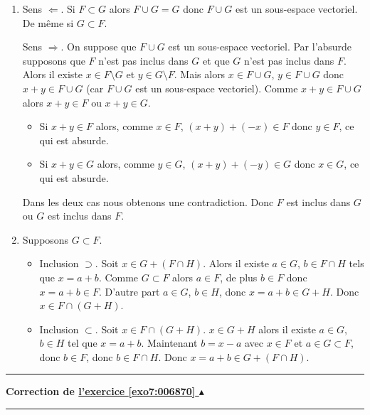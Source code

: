 \documentclass[11pt,a4paper]{article}
\newcounter{exo}
\newcommand{\correction}[1]{\hypertarget{cor7:#1}{}\label{cor7:#1}{\bf Correction de \hyperlink{exo7:#1}{l'exercice \ref{exo7:#1} $\blacktriangle$}}\vspace{1mm}\hrule\vspace{1mm}}
\newcommand{\fincorrection}{\vspace{1mm}\hrule\vspace*{7mm}}
\begin{document}
\begin{enumerate}
\item Sens $\Leftarrow$. Si $F\subset G$ alors $F\cup G=G$ donc $F\cup
  G$ est un sous-espace vectoriel.  De m\^eme si $G\subset F$.
  
  Sens $\Rightarrow$. On suppose que $F\cup G$ est un sous-espace
  vectoriel.  Par l'absurde supposons que $F$ n'est pas inclus dans
  $G$ et que $G$ n'est pas inclus dans $F$. Alors il existe $x\in
  F\setminus G$ et $y\in G\setminus F$. Mais alors $x\in F\cup G$,
  $y\in F\cup G$ donc $x+y\in F\cup G$ (car $F\cup G$ est un
  sous-espace vectoriel). Comme $x+y\in F\cup G$ alors
$x+y\in F$ ou $x+y\in G$.
\begin{itemize}
 \item Si $x+y\in F$ alors, comme $x\in F$, $(x+y)+(-x) \in F$ donc $y\in F$, ce qui est absurde.
 \item  Si $x+y\in G$ alors, comme $y\in G$, $(x+y)+(-y) \in G$ donc $x\in G$, ce qui est absurde.
\end{itemize}  
Dans les deux cas nous obtenons une contradiction. Donc $F$ est inclus
dans $G$ ou $G$ est inclus dans $F$.

\item Supposons $G\subset F$.
\begin{itemize}
 \item Inclusion $\supset$. Soit $x\in G+(F\cap H)$. Alors il existe $a\in G$, $b\in F\cap H$ tels que $x=a+b$. Comme $G\subset F$ alors $a\in F$, de plus $b\in F$ donc $x=a+b\in F$.
D'autre part $a\in G$, $b\in H$, donc $x=a+b\in G+H$. Donc $x\in F\cap(G+H)$.
 \item Inclusion $\subset$. Soit $x\in F\cap(G+H)$. $x\in G+H$ alors il existe $a\in G$,
$b\in H$ tel que $x=a+b$. Maintenant $b=x-a$ avec $x\in F$ et $a\in G\subset F$, donc $b\in F$,
donc $b\in F\cap H$. Donc $x=a+b\in G+(F\cap H)$.
\end{itemize}  
  
\end{enumerate}
\fincorrection
\correction{006870}
\end{document}
